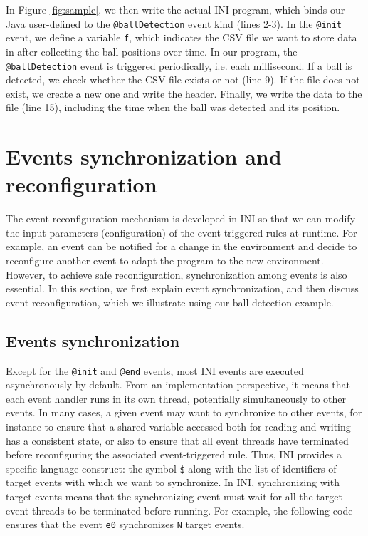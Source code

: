 \documentclass[runningheads,a4paper]{llncs}
\begin{document}
\vspace{-10pt}

In Figure \ref{fig:sample}, we then write the actual INI program, which binds our Java user-defined to the \texttt{@ballDetection} event kind (lines 2-3). In the \texttt{@init} event, we define a variable \texttt{f}, which indicates the CSV file we want to store data in after collecting the ball positions over time. In our program, the \texttt{@ballDetection} event is triggered periodically, i.e. each millisecond. If a ball is detected, we check whether the CSV file exists or not (line 9). If the file does not exist, we create a new one and write the header. Finally, we write the data to the file (line 15), including the time when the ball was detected and its position.

\section{Events synchronization and reconfiguration} \label{sec:SyncAndReconf}

The event reconfiguration mechanism is developed in INI so that we can modify the input parameters (configuration) of the event-triggered rules at runtime. For example, an event can be notified for a change in the environment and decide to reconfigure another event to adapt the program to the new environment. However, to achieve safe reconfiguration, synchronization among events is also essential. In this section, we first explain event synchronization, and then discuss event reconfiguration, which we illustrate using our ball-detection example.

\subsection{Events synchronization}

Except for the \texttt{@init} and \texttt{@end} events, most INI events are executed asynchronously by default. From an implementation perspective, it means that each event handler runs in its own thread, potentially simultaneously to other events. In many cases, a given event may want to synchronize to other events, for instance to ensure that a shared variable accessed both for reading and writing has a consistent state, or also to ensure that all event threads have terminated before reconfiguring the associated event-triggered rule. Thus, INI provides a specific language construct: the symbol \texttt{\$} along with the list of identifiers of target events with which we want to synchronize. In INI, synchronizing with target events means that the synchronizing event must wait for all the target event threads to be terminated before running. For example, the following code ensures that the event \texttt{e0} synchronizes \texttt{N} target events.
\end{document}
